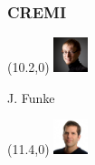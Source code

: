 \documentclass[aspectratio=169,table]{beamer}
\begin{document}
\begin{frame}
    \frametitle{CREMI}


    \begin{textblock}{3}(10.2,0)
        \tiny\includegraphics[width=1cm]{fig/people/funke.png}
        
        J. Funke%
    \end{textblock}%
    
    \begin{textblock}{3}(11.4,0)
        \tiny\includegraphics[width=1cm]{fig/people/bock.jpeg}
        

\end{textblock}
\end{frame}
\end{document}
